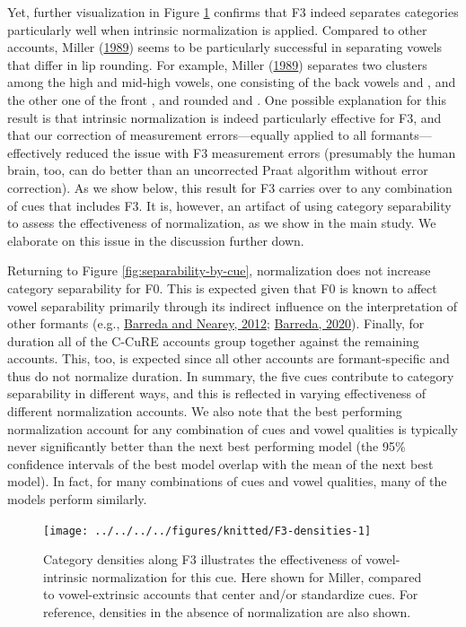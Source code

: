 \documentclass[utf8]{frontiers_suppmat} %
\begin{document}
Yet, further visualization in Figure \ref{fig:F3-densities} confirms that F3 indeed separates categories particularly well when intrinsic normalization is applied. Compared to other accounts, Miller (\protect\hyperlink{ref-miller1989c}{1989}) seems to be particularly successful in separating vowels that differ in lip rounding. For example, Miller (\protect\hyperlink{ref-miller1989c}{1989}) separates two clusters among the high and mid-high vowels, one consisting of the back vowels \ipatext{[oː]} and \ipatext{[uː]}, and the other one of the front \ipatext{[iː]}, and rounded \ipatext{[yː]} and \ipatext{[ʉː]}. One possible explanation for this result is that intrinsic normalization is indeed particularly effective for F3, and that our correction of measurement errors---equally applied to all formants---effectively reduced the issue with F3 measurement errors (presumably the human brain, too, can do better than an uncorrected Praat algorithm without error correction). As we show below, this result for F3 carries over to any combination of cues that includes F3. It is, however, an artifact of using category separability to assess the effectiveness of normalization, as we show in the main study. We elaborate on this issue in the discussion further down.

Returning to Figure \ref{fig:separability-by-cue}, normalization does not increase category separability for F0. This is expected given that F0 is known to affect vowel separability primarily through its indirect influence on the interpretation of other formants (e.g., \protect\hyperlink{ref-barreda2012a}{Barreda and Nearey, 2012}; \protect\hyperlink{ref-barreda2020a}{Barreda, 2020}). Finally, for duration all of the C-CuRE accounts group together against the remaining accounts. This, too, is expected since all other accounts are formant-specific and thus do not normalize duration. In summary, the five cues contribute to category separability in different ways, and this is reflected in varying effectiveness of different normalization accounts. We also note that the best performing normalization account for any combination of cues and vowel qualities is typically never significantly better than the next best performing model (the 95\% confidence intervals of the best model overlap with the mean of the next best model). In fact, for many combinations of cues and vowel qualities, many of the models perform similarly.

\begin{figure}
{\centering \texttt{[image: ../../../../figures/knitted/F3-densities-1]} }
\caption{Category densities along F3 illustrates the effectiveness of vowel-intrinsic normalization for this cue. Here shown for Miller, compared to vowel-extrinsic accounts that center and/or standardize cues. For reference, densities in the absence of normalization are also shown.}\label{fig:F3-densities}
\end{figure}
\end{document}
